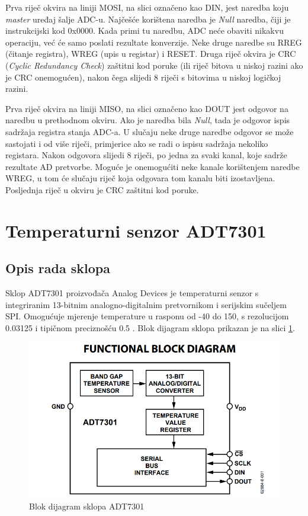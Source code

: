 Prva riječ okvira na liniji MOSI, na slici označeno kao DIN, jest naredba koju \textit{master} uređaj šalje ADC-u. Najčešće korištena naredba je \textit{Null} naredba, čiji je instrukcijski kod 0x0000. Kada primi tu naredbu, ADC neće obaviti nikakvu operaciju, već će samo poslati rezultate konverzije. Neke druge naredbe su RREG (čitanje registra), WREG (upis u registar) i RESET. Druga riječ okvira je CRC (\textit{Cyclic Redundancy Check}) zaštitni kod poruke (ili riječ bitova u niskoj razini ako je CRC onemogućen), nakon čega slijedi 8 riječi s bitovima u niskoj logičkoj razini.

Prva riječ okvira na liniji MISO, na slici označeno kao DOUT jest odgovor na naredbu u prethodnom okviru. Ako je naredba bila \textit{Null}, tada je odgovor ispis sadržaja registra stanja ADC-a. U slučaju neke druge naredbe odgovor se može sastojati i od više riječi, primjerice ako se radi o ispisu sadržaja nekoliko registara. Nakon odgovora slijedi 8 riječi, po jedna za svaki kanal, koje sadrže rezultate AD pretvorbe. Moguće je onemogućiti neke kanale korištenjem naredbe WREG, u tom će slučaju riječ koja odgovara tom kanalu biti izostavljena. Posljednja riječ u okviru je CRC zaštitni kod poruke.

\section{Temperaturni senzor ADT7301}

\subsection{Opis rada sklopa}
Sklop ADT7301 proizvođača Analog Devices je temperaturni senzor s integriranim 13-bitnim analogno-digitalnim pretvornikom i serijskim sučeljem SPI. Omogućuje mjerenje temperature u rasponu od -40\textcelsius{} do 150\textcelsius{}, s rezolucijom 0.03125\textcelsius{} i tipičnom preciznošću \textpm{} 0.5\textcelsius{} \cite{adt7301_datasheet}. Blok dijagram sklopa prikazan je na slici \ref{fig:adt7301_blok_dijagram}.

\begin{figure}[htb]
    \centering
    \includegraphics{slike/ADT7301_blok_dijagram.png}
    \caption{Blok dijagram sklopa ADT7301 \cite{adt7301_datasheet}}
    \label{fig:adt7301_blok_dijagram}
\end{figure}


